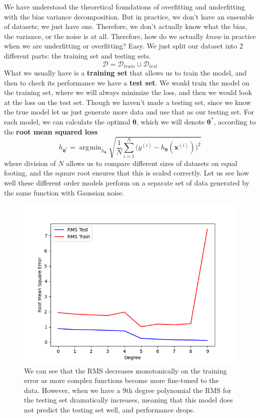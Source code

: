 \documentclass{article}
\DeclareMathOperator*{\argmin}{\arg\!\min}
\begin{document}
    We have understood the theoretical foundations of overfitting and underfitting with the bias variance decomposition. But in practice, we don't have an ensemble of datasets; we just have one. Therefore, we don't actually know what the bias, the variance, or the noise is at all. Therefore, how do we actually \textit{know} in practice when we are underfitting or overfitting? Easy. We just split our dataset into 2 different parts: the training set and testing sets. 
    \begin{equation}
      \mathcal{D} = \mathcal{D}_{train} \sqcup \mathcal{D}_{test}
    \end{equation}
    What we usually have is a \textbf{training set} that allows us to train the model, and then to check its performance we have a \textbf{test set}. We would train the model on the training set, where we will always minimize the loss, and then we would look at the loss on the test set. Though we haven't made a testing set, since we know the true model let us just generate more data and use that as our testing set. For each model, we can calculate the optimal $\boldsymbol{\theta}$, which we will denote $\boldsymbol{\theta}^\ast$, according to the \textbf{root mean squared loss}
    \begin{equation}
      h_{\boldsymbol{\theta}^\ast} = \argmin_{h_{\boldsymbol{\theta}}} \sqrt{ \frac{1}{N} \sum_{i=1}^N \big( y^{(i)} - h_{\boldsymbol{\theta}} (\mathbf{x}^{(i)}) \big)^2 }
    \end{equation}
    where division of $N$ allows us to compare different sizes of datasets on equal footing, and the square root ensures that this is scaled correctly. Let us see how well these different order models perform on a separate set of data generated by the same function with Gaussian noise. 

    \begin{figure}[H]
      \centering
      \includegraphics[scale=0.4]{img/Degree_vs_RMS.png}
      \caption{We can see that the RMS decreases monotonically on the training error as more complex functions become more fine-tuned to the data. However, when we have a $9$th degree polynomial the RMS for the testing set dramatically increases, meaning that this model does not predict the testing set well, and performance drops. }
      \label{fig:poly_deg_vs_rms}
    \end{figure}
\end{document}

